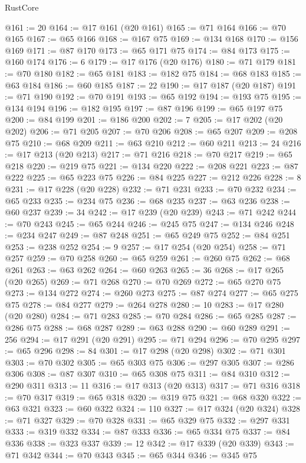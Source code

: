 \begin{lexlean}{RustCore}
\begin{coremodule}
@161 := 20
@164 := @17 @161 (@20 @161)
@165 := @71 @164
@166 := @70 @165
@167 := @65 @166
@168 := @167 @75
@169 := @134 @168
@170 := @156 @169
@171 := @87 @170
@173 := @65 @171 @75
@174 := @84 @173
@175 := @160 @174
@176 := 6
@179 := @17 @176 (@20 @176)
@180 := @71 @179
@181 := @70 @180
@182 := @65 @181
@183 := @182 @75
@184 := @68 @183
@185 := @63 @184
@186 := @60 @185
@187 := 22
@190 := @17 @187 (@20 @187)
@191 := @71 @190
@192 := @70 @191
@193 := @65 @192
@194 := @193 @75
@195 := @134 @194
@196 := @182 @195
@197 := @87 @196
@199 := @65 @197 @75
@200 := @84 @199
@201 := @186 @200
@202 := 7
@205 := @17 @202 (@20 @202)
@206 := @71 @205
@207 := @70 @206
@208 := @65 @207
@209 := @208 @75
@210 := @68 @209
@211 := @63 @210
@212 := @60 @211
@213 := 24
@216 := @17 @213 (@20 @213)
@217 := @71 @216
@218 := @70 @217
@219 := @65 @218
@220 := @219 @75
@221 := @134 @220
@222 := @208 @221
@223 := @87 @222
@225 := @65 @223 @75
@226 := @84 @225
@227 := @212 @226
@228 := 8
@231 := @17 @228 (@20 @228)
@232 := @71 @231
@233 := @70 @232
@234 := @65 @233
@235 := @234 @75
@236 := @68 @235
@237 := @63 @236
@238 := @60 @237
@239 := 34
@242 := @17 @239 (@20 @239)
@243 := @71 @242
@244 := @70 @243
@245 := @65 @244
@246 := @245 @75
@247 := @134 @246
@248 := @234 @247
@249 := @87 @248
@251 := @65 @249 @75
@252 := @84 @251
@253 := @238 @252
@254 := 9
@257 := @17 @254 (@20 @254)
@258 := @71 @257
@259 := @70 @258
@260 := @65 @259
@261 := @260 @75
@262 := @68 @261
@263 := @63 @262
@264 := @60 @263
@265 := 36
@268 := @17 @265 (@20 @265)
@269 := @71 @268
@270 := @70 @269
@272 := @65 @270 @75
@273 := @134 @272
@274 := @260 @273
@275 := @87 @274
@277 := @65 @275 @75
@278 := @84 @277
@279 := @264 @278
@280 := 10
@283 := @17 @280 (@20 @280)
@284 := @71 @283
@285 := @70 @284
@286 := @65 @285
@287 := @286 @75
@288 := @68 @287
@289 := @63 @288
@290 := @60 @289
@291 := 256
@294 := @17 @291 (@20 @291)
@295 := @71 @294
@296 := @70 @295
@297 := @65 @296
@298 := 84
@301 := @17 @298 (@20 @298)
@302 := @71 @301
@303 := @70 @302
@305 := @65 @303 @75
@306 := @297 @305
@307 := @286 @306
@308 := @87 @307
@310 := @65 @308 @75
@311 := @84 @310
@312 := @290 @311
@313 := 11
@316 := @17 @313 (@20 @313)
@317 := @71 @316
@318 := @70 @317
@319 := @65 @318
@320 := @319 @75
@321 := @68 @320
@322 := @63 @321
@323 := @60 @322
@324 := 110
@327 := @17 @324 (@20 @324)
@328 := @71 @327
@329 := @70 @328
@331 := @65 @329 @75
@332 := @297 @331
@333 := @319 @332
@334 := @87 @333
@336 := @65 @334 @75
@337 := @84 @336
@338 := @323 @337
@339 := 12
@342 := @17 @339 (@20 @339)
@343 := @71 @342
@344 := @70 @343
@345 := @65 @344
@346 := @345 @75

\end{coremodule}
\end{lexlean}
